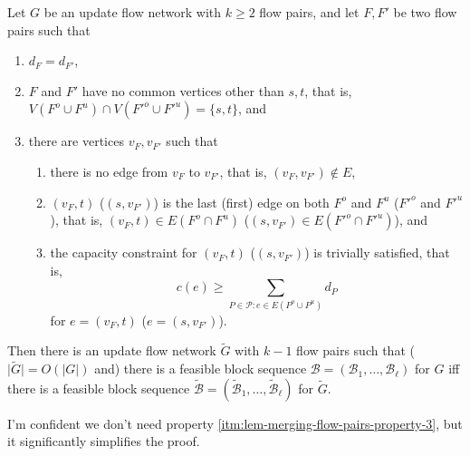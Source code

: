 \documentclass[fontsize=11pt,paper=a4]{book}
\begin{document}
\begin{lem}
Let \(G\) be an update flow network with \(k\geq 2\) flow pairs, and let \(F,F'\) be two flow pairs such that

\begin{enumerate}
\item \label{itm:lem-merging-flow-pairs-property-1}
\(d_F=d_{F'}\),

\item \label{itm:lem-merging-flow-pairs-property-2}
\(F\) and \(F'\) have no common vertices other than \(s,t\), that is, \(V(F^o\cup F^u)\cap V(F'^o\cup F'^u)=\{s,t\}\), and

\item \label{itm:lem-merging-flow-pairs-property-3}
there are vertices \(v_F,v_{F'}\) such that

\begin{enumerate}
\item \label{itm:lem-merging-flow-pairs-property-3-1}
there is no edge from \(v_F\) to \(v_{F'}\), that is, \((v_F,v_{F'})\notin E\),

\item \label{itm:lem-merging-flow-pairs-property-3-2}
\((v_F,t)\) (\((s,v_{F'})\)) is the last (first) edge on both \(F^o\) and \(F^u\) (\(F'^o\) and \(F'^u\)), that is, \((v_F,t)\in E(F^o\cap F^u)\) (\((s,v_{F'})\in E(F'^o\cap F'^u)\)), and

\item \label{itm:lem-merging-flow-pairs-property-3-3}
the capacity constraint for \((v_F,t)\) (\((s,v_{F'})\)) is trivially satisfied, that is,
\[
      c(e)\geq\sum_{P\in\mathcal{P}:e\in E(P^o\cup P^u)}d_P
      \]
for \(e=(v_F,t)\) (\(e=(s,v_{F'})\)).
\end{enumerate}
\end{enumerate}


Then there is an update flow network \(\tilde{G}\) with \(k-1\) flow pairs such that (\(\lvert\tilde{G}\rvert=O(\lvert G\rvert)\) and) there is a feasible block sequence \(\mathcal{B}=(\mathscr{B}_1,\dots,\mathscr{B}_{\ell})\) for \(G\) iff there is a feasible block sequence \(\tilde{\mathcal{B}}=(\tilde{\mathscr{B}}_1,\dots,\tilde{\mathscr{B}}_{\ell})\) for \(\tilde{G}\).
\label{org7dbdd46}
\end{lem}

\begin{remark}
I'm confident we don't need property \ref{itm:lem-merging-flow-pairs-property-3}, but it significantly simplifies the proof.
\end{remark}
\end{document}
